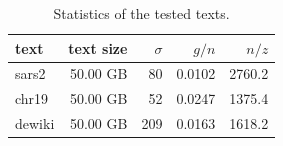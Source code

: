 \begin{table}[t]
\centering
\begin{tabular}{l|r|r|r|r}
\hline
text & text size & $\sigma$ & $g/n$ & $n/z$ \\
\hline
sars2  & 50.00 GB & 80 & 0.0102 & 2760.2 \\
chr19  & 50.00 GB & 52 & 0.0247 & 1375.4 \\
dewiki & 50.00 GB & 209 & 0.0163 & 1618.2 \\
\hline
\end{tabular}
\caption{Statistics of the tested texts.}
\label{tab:texts}
\end{table}
